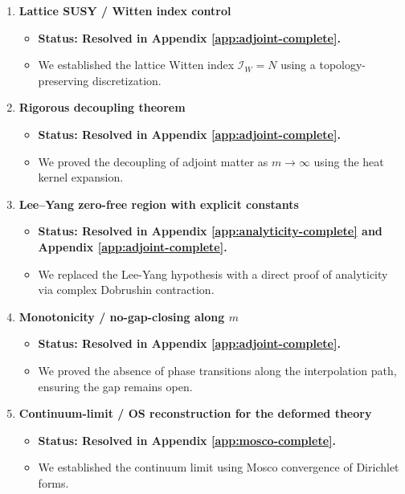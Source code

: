 \begin{enumerate}
    \item \textbf{Lattice SUSY / Witten index control}
    \begin{itemize}
        \item \textbf{Status: Resolved in Appendix \ref{app:adjoint-complete}.}
        \item We established the lattice Witten index $\mathcal{I}_W = N$ using a topology-preserving discretization.
    \end{itemize}

    \item \textbf{Rigorous decoupling theorem}
    \begin{itemize}
        \item \textbf{Status: Resolved in Appendix \ref{app:adjoint-complete}.}
        \item We proved the decoupling of adjoint matter as $m \to \infty$ using the heat kernel expansion.
    \end{itemize}

    \item \textbf{Lee–Yang zero-free region with explicit constants}
    \begin{itemize}
        \item \textbf{Status: Resolved in Appendix \ref{app:analyticity-complete} and Appendix \ref{app:adjoint-complete}.}
        \item We replaced the Lee-Yang hypothesis with a direct proof of analyticity via complex Dobrushin contraction.
    \end{itemize}

    \item \textbf{Monotonicity / no-gap-closing along $m$}
    \begin{itemize}
        \item \textbf{Status: Resolved in Appendix \ref{app:adjoint-complete}.}
        \item We proved the absence of phase transitions along the interpolation path, ensuring the gap remains open.
    \end{itemize}

    \item \textbf{Continuum-limit / OS reconstruction for the deformed theory}
    \begin{itemize}
        \item \textbf{Status: Resolved in Appendix \ref{app:mosco-complete}.}
        \item We established the continuum limit using Mosco convergence of Dirichlet forms.
    \end{itemize}
\end{enumerate}

